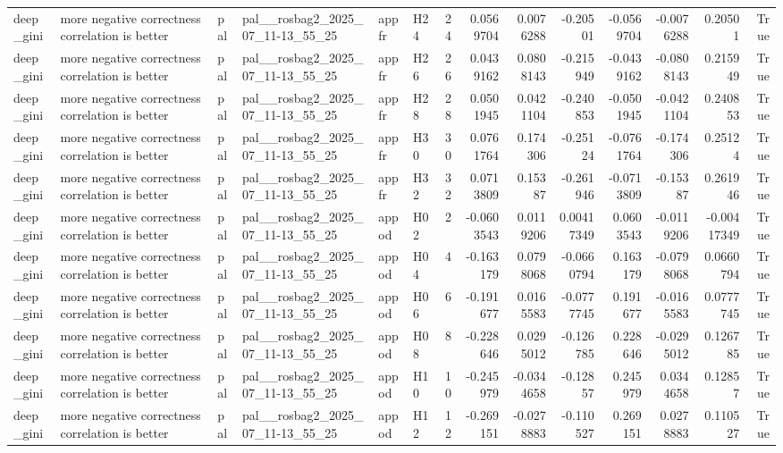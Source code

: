 \begin{longtable}{llllllrrrrrrrr}
deep\_gini & more negative correctness correlation is better & pal & pal\_\_rosbag2\_2025\_07\_11-13\_55\_25 & appfr & H24 & 24 & 0.0569704 & 0.0076288 & -0.20501 & -0.0569704 & -0.0076288 & 0.20501 & True \\
deep\_gini & more negative correctness correlation is better & pal & pal\_\_rosbag2\_2025\_07\_11-13\_55\_25 & appfr & H26 & 26 & 0.0439162 & 0.0808143 & -0.215949 & -0.0439162 & -0.0808143 & 0.215949 & True \\
deep\_gini & more negative correctness correlation is better & pal & pal\_\_rosbag2\_2025\_07\_11-13\_55\_25 & appfr & H28 & 28 & 0.0501945 & 0.0421104 & -0.240853 & -0.0501945 & -0.0421104 & 0.240853 & True \\
deep\_gini & more negative correctness correlation is better & pal & pal\_\_rosbag2\_2025\_07\_11-13\_55\_25 & appfr & H30 & 30 & 0.0761764 & 0.174306 & -0.25124 & -0.0761764 & -0.174306 & 0.25124 & True \\
deep\_gini & more negative correctness correlation is better & pal & pal\_\_rosbag2\_2025\_07\_11-13\_55\_25 & appfr & H32 & 32 & 0.0713809 & 0.15387 & -0.261946 & -0.0713809 & -0.15387 & 0.261946 & True \\
deep\_gini & more negative correctness correlation is better & pal & pal\_\_rosbag2\_2025\_07\_11-13\_55\_25 & appod & H02 & 2 & -0.0603543 & 0.0119206 & 0.00417349 & 0.0603543 & -0.0119206 & -0.00417349 & True \\
deep\_gini & more negative correctness correlation is better & pal & pal\_\_rosbag2\_2025\_07\_11-13\_55\_25 & appod & H04 & 4 & -0.163179 & 0.0798068 & -0.0660794 & 0.163179 & -0.0798068 & 0.0660794 & True \\
deep\_gini & more negative correctness correlation is better & pal & pal\_\_rosbag2\_2025\_07\_11-13\_55\_25 & appod & H06 & 6 & -0.191677 & 0.0165583 & -0.0777745 & 0.191677 & -0.0165583 & 0.0777745 & True \\
deep\_gini & more negative correctness correlation is better & pal & pal\_\_rosbag2\_2025\_07\_11-13\_55\_25 & appod & H08 & 8 & -0.228646 & 0.0295012 & -0.126785 & 0.228646 & -0.0295012 & 0.126785 & True \\
deep\_gini & more negative correctness correlation is better & pal & pal\_\_rosbag2\_2025\_07\_11-13\_55\_25 & appod & H10 & 10 & -0.245979 & -0.0344658 & -0.12857 & 0.245979 & 0.0344658 & 0.12857 & True \\
deep\_gini & more negative correctness correlation is better & pal & pal\_\_rosbag2\_2025\_07\_11-13\_55\_25 & appod & H12 & 12 & -0.269151 & -0.0278883 & -0.110527 & 0.269151 & 0.0278883 & 0.110527 & True \\

\end{longtable}

